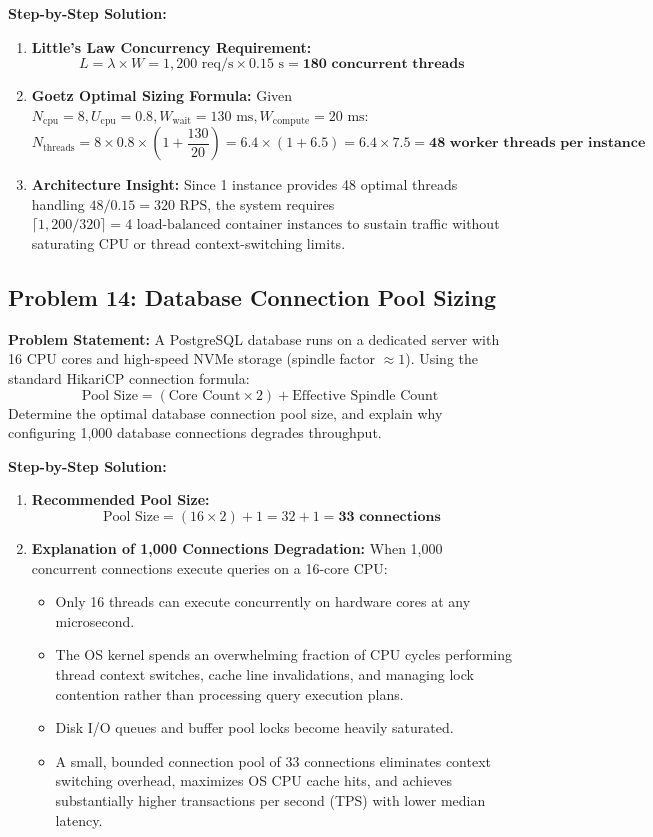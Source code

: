\textbf{Step-by-Step Solution:}
\begin{enumerate}[label=(\alph*)]
    \item \textbf{Little's Law Concurrency Requirement:}
    \[
    L = \lambda \times W = 1,200\text{ req/s} \times 0.15\text{ s} = \mathbf{180\text{ concurrent threads}}
    \]
    \item \textbf{Goetz Optimal Sizing Formula:}
    Given $N_{\text{cpu}} = 8, U_{\text{cpu}} = 0.8, W_{\text{wait}} = 130\text{ ms}, W_{\text{compute}} = 20\text{ ms}$:
    \[
    N_{\text{threads}} = 8 \times 0.8 \times \left(1 + \frac{130}{20}\right) = 6.4 \times (1 + 6.5) = 6.4 \times 7.5 = \mathbf{48\text{ worker threads per instance}}
    \]
    \item \textbf{Architecture Insight:} Since 1 instance provides 48 optimal threads handling $48 / 0.15 = 320\text{ RPS}$, the system requires $\lceil 1,200 / 320 \rceil = 4\text{ load-balanced container instances}$ to sustain traffic without saturating CPU or thread context-switching limits.
\end{enumerate}

\subsection*{Problem 14: Database Connection Pool Sizing}
\textbf{Problem Statement:} A PostgreSQL database runs on a dedicated server with 16 CPU cores and high-speed NVMe storage (spindle factor $\approx 1$). Using the standard HikariCP connection formula:
\[
\text{Pool Size} = (\text{Core Count} \times 2) + \text{Effective Spindle Count}
\]
Determine the optimal database connection pool size, and explain why configuring 1,000 database connections degrades throughput.

\textbf{Step-by-Step Solution:}
\begin{enumerate}[label=\arabic*.]
    \item \textbf{Recommended Pool Size:}
    \[
    \text{Pool Size} = (16 \times 2) + 1 = 32 + 1 = \mathbf{33\text{ connections}}
    \]
    \item \textbf{Explanation of 1,000 Connections Degradation:}
    When 1,000 concurrent connections execute queries on a 16-core CPU:
    \begin{itemize}
        \item Only 16 threads can execute concurrently on hardware cores at any microsecond.
        \item The OS kernel spends an overwhelming fraction of CPU cycles performing thread context switches, cache line invalidations, and managing lock contention rather than processing query execution plans.
        \item Disk I/O queues and buffer pool locks become heavily saturated.
        \item A small, bounded connection pool of 33 connections eliminates context switching overhead, maximizes OS CPU cache hits, and achieves substantially higher transactions per second (TPS) with lower median latency.
    \end{itemize}
\end{enumerate}

